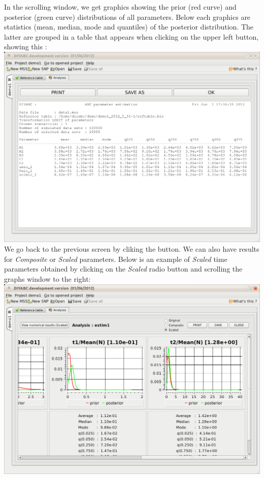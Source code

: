 In the scrolling window, we get graphics showing the prior (red curve) and posterior (green curve) distributions of all parameters. Below each graphics are statistics (mean, median, mode and quantiles) of the posterior distribution. The latter are grouped in a table that appears when clicking on the upper left  button, showing this :\\

\includegraphics[scale=0.35]{gui_pictures/Capture-DIYABC-41.png} \\

We go back to the previous screen by cliking the  button.
\newpage
 We can also have results for \emph{Composite} or \emph{Scaled} parameters. Below is an example of \emph{Scaled} time parameters obtained by clicking on the \emph{Scaled} radio button and scrolling the graphs window to the right:\\
 
\includegraphics[scale=0.35]{gui_pictures/Capture-DIYABC-42.png} \\



